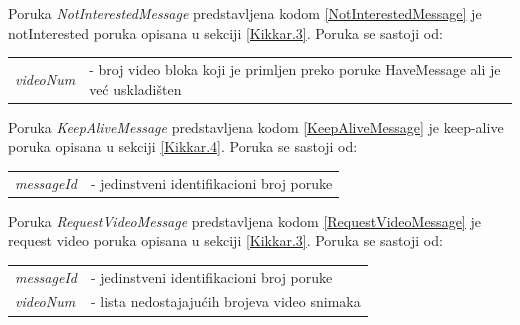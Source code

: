 \documentclass[12pt,oneside]{memoir}
\begin{document}


Poruka \textit{NotInterestedMessage} predstavljena kodom \ref{NotInterestedMessage} je notInterested poruka opisana u sekciji \ref{Kikkar.3}. Poruka se sastoji od:
 
\begin{center}
\begin{tabular}{ p{4cm} p{10cm} }
 \textit{videoNum} & - broj video bloka koji je primljen preko poruke HaveMessage ali je već uskladišten \\ 
\end{tabular}
\end{center}




Poruka \textit{KeepAliveMessage} predstavljena kodom \ref{KeepAliveMessage} je keep-alive poruka opisana u sekciji \ref{Kikkar.4}. Poruka se sastoji od:
 
\begin{center}
\begin{tabular}{ p{4cm} p{10cm} }
 \textit{messageId} & - jedinstveni identifikacioni broj poruke \\ 
\end{tabular}
\end{center}




Poruka \textit{RequestVideoMessage} predstavljena kodom \ref{RequestVideoMessage} je request video poruka opisana u sekciji \ref{Kikkar.3}. Poruka se sastoji od:
 
\begin{center}
\begin{tabular}{ p{4cm} p{10cm} }
 \textit{messageId} & - jedinstveni identifikacioni broj poruke \\ 
 \textit{videoNum} & - lista nedostajajućih brojeva video snimaka \\ 
\end{tabular}
\end{center}



\end{document}
